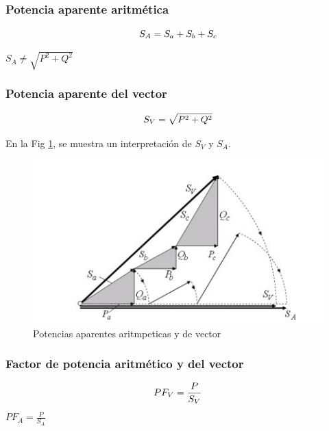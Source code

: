 \subsubsection{Potencia aparente aritmética }

\begin{equation}\label{EQ52}
S_{A}=S_{a}+S_{b}+S_{c}\\
\end{equation}

$S_{A} \neq \sqrt{P^2+Q^2}$

\subsubsection{Potencia aparente del vector}

\begin{equation}\label{EQ53}
S_{V}=\sqrt{P^2+Q^2}\\
\end{equation}

En la Fig \ref{fig:inter}, se muestra un interpretación de $S_{V}$ y $S_{A}$.

\begin{figure}[H]
\centering
\includegraphics{2Marco/intergeo}
\caption{Potencias aparentes aritmpeticas y de vector} 
\label{fig:inter}
\end{figure} 

\subsubsection{Factor de potencia aritmético y del vector }

\begin{equation}\label{EQ54}
PF_{V}=\frac{P}{S_{V}}\\
\end{equation}
$PF_{A}=\frac{P}{S_{A}}$\\

